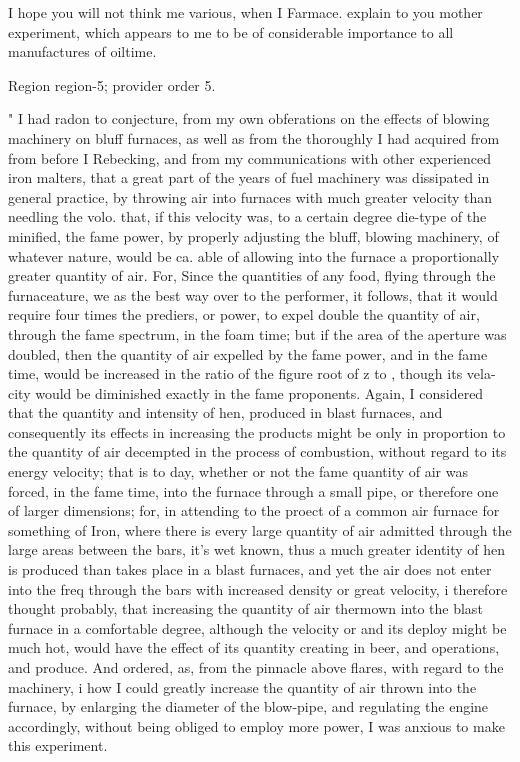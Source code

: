 \documentclass[11pt]{article}
\begin{document}
I hope you will not think me various, when I Farmace. explain to you mother experiment, which appears to me to be of considerable importance to all manufactures of oiltime.
\par

{\scriptsize\color{gray} Region region-5; provider order 5.\par}
\medskip

" I had radon to conjecture, from my own obferations on the effects of blowing machinery on bluff furnaces, as well as from the thoroughly I had acquired from from before I Rebecking, and from my communications with other experienced iron malters, that a great part of the years of fuel machinery was dissipated in general practice, by throwing air into furnaces with much greater velocity than needling the volo. that, if this velocity was, to a certain degree die-type of the minified, the fame power, by properly adjusting the bluff, blowing machinery, of whatever nature, would be ca. able of allowing into the furnace a proportionally greater quantity of air. For, Since the quantities of any food, flying through the furnaceature, we as the best way over to the performer, it follows, that it would require four times the prediers, or power, to expel double the quantity of air, through the fame spectrum, in the foam time; but if the area of the aperture was doubled, then the quantity of air expelled by the fame power, and in the fame time, would be increased in the ratio of the figure root of z to , though its vela-city would be diminished exactly in the fame proponents. Again, I considered that the quantity and intensity of hen, produced in blast furnaces, and consequently its effects in increasing the products might be only in proportion to the quantity of air decempted in the process of combustion, without regard to its energy velocity; that is to day, whether or not the fame quantity of air was forced, in the fame time, into the furnace through a small pipe, or therefore one of larger dimensions; for, in attending to the proect of a common air furnace for something of Iron, where there is every large quantity of air admitted through the large areas between the bars, it's wet known, thus a much greater identity of hen is produced than takes place in a blast furnaces, and yet the air does not enter into the freq through the bars with increased density or great velocity, i therefore thought probably, that increasing the quantity of air thermown into the blast furnace in a comfortable degree, although the velocity or and its deploy might be much hot, would have the effect of its quantity creating in beer, and operations, and produce. And ordered, as, from the pinnacle above flares, with regard to the machinery, i how I could greatly increase the quantity of air thrown into the furnace, by enlarging the diameter of the blow-pipe, and regulating the engine accordingly, without being obliged to employ more power, I was anxious to make this experiment.
\par
\end{document}
